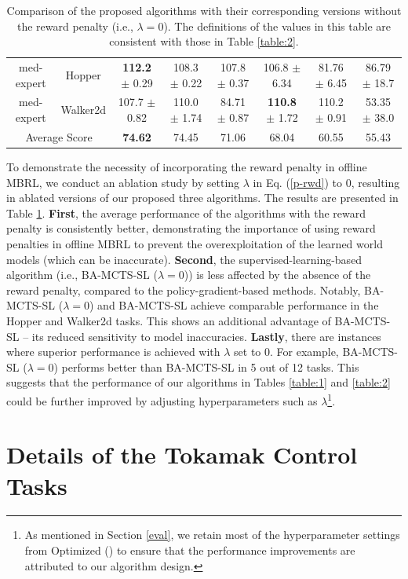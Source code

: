 \begin{table}[htbp]
\begin{tabular}{c|c|c|c|c|c|c|c}
{med-expert} & {Hopper} & {\textbf{112.2} $\pm$ 0.29} & {108.3 $\pm$ 0.22} & {107.8 $\pm$ 0.37} & {106.8 $\pm$ 6.34} & {81.76 $\pm$ 6.45} & {86.79 $\pm$ 18.7}\\
{med-expert} & {Walker2d} & {107.7 $\pm$ 0.82} & {110.0 $\pm$ 1.74} & {84.71 $\pm$ 0.87} & {\textbf{110.8} $\pm$ 1.72} & {110.2 $\pm$ 0.91} & {53.35 $\pm$ 38.0}\\
\hline
\hline
\multicolumn{2}{c|}{Average Score} & {\textbf{74.62}} & {74.45} & {71.06} & {68.04} & {60.55} & {55.43} \\
\hline 
\end{tabular}
\caption{Comparison of the proposed algorithms with their corresponding versions without the reward penalty (i.e., $\lambda=0$). The definitions of the values in this table are consistent with those in Table \ref{table:2}.}
\label{table:8}
\end{table}

To demonstrate the necessity of incorporating the reward penalty in offline MBRL, we conduct an ablation study by setting $\lambda$ in Eq. (\ref{p-rwd}) to 0, resulting in ablated versions of our proposed three algorithms. The results are presented in Table \ref{table:8}. \textbf{First}, the average performance of the algorithms with the reward penalty is consistently better, demonstrating the importance of using reward penalties in offline MBRL to prevent the overexploitation of the learned world models (which can be inaccurate). \textbf{Second}, the supervised-learning-based algorithm (i.e., BA-MCTS-SL ($\lambda=0$)) is less affected by the absence of the reward penalty, compared to the policy-gradient-based methods. Notably, BA-MCTS-SL ($\lambda=0$) and BA-MCTS-SL achieve comparable performance in the Hopper and Walker2d tasks. This shows an additional advantage of BA-MCTS-SL -- its reduced sensitivity to model inaccuracies. \textbf{Lastly}, there are instances where superior performance is achieved with $\lambda$ set to 0. For example, BA-MCTS-SL ($\lambda=0$) performs better than BA-MCTS-SL in 5 out of 12 tasks. This suggests that the performance of our algorithms in Tables \ref{table:1} and \ref{table:2} could be further improved by adjusting hyperparameters such as $\lambda$\footnote{As mentioned in Section \ref{eval}, we retain most of the hyperparameter settings from Optimized (\cite{DBLP:conf/iclr/LuBPOR22}) to ensure that the performance improvements are attributed to our algorithm design.}.

\section{Details of the Tokamak Control Tasks} \label{DetTCT}

